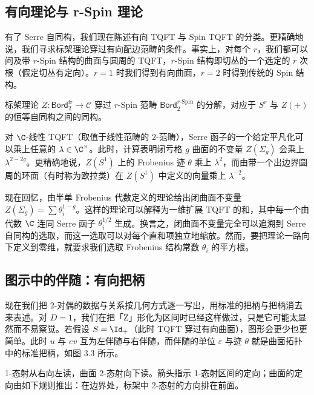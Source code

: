\subsection{有向理论与 r-Spin 理论}

有了 Serre 自同构，我们现在陈述有向 TQFT 与 Spin TQFT 的分类。更精确地说，我们寻求标架理论穿过有向配边范畴的条件。事实上，对每个 $r$，我们都可以问及带 $r$-Spin 结构的曲面与圆周的 TQFT，$r$-Spin 结构即切丛的一个选定的 $r$ 次根（假定切丛有定向）。$r=1$ 时我们得到有向曲面，$r=2$ 时得到传统的 Spin 结构。

\begin{theorem}\label{thm:3.4.14}
标架理论 $Z\colon\mathsf{Bord}^{\mathrm{fr}}_2\to\mathcal{C}$ 穿过 $r$-Spin 范畴 $\mathsf{Bord}^{r\text{-}\mathrm{Spin}}_2$ 的分解，对应于 $S^r$ 与 $Z(+)$ 的恒等自同构之间的同构。
\end{theorem}

\begin{example}[半单 TQFT]\label{ex:3.4.15}
对 $\C$-线性 TQFT（取值于线性范畴的 2-范畴），Serre 函子的一个给定平凡化可以乘上任意的 $\lambda\in\C^\times$。此时，计算表明闭亏格 $g$ 曲面的不变量 $Z(\Sigma_g)$ 会乘上 $\lambda^{2-2g}$。更精确地说，$Z(S^1)$ 上的 Frobenius 迹 $\theta$ 乘上 $\lambda^2$，而由带一个出边界圆周的环面（有时称为欧拉类）在 $Z(S^1)$ 中定义的向量乘上 $\lambda^{-2}$。

现在回忆，由半单 Frobenius 代数定义的理论给出闭曲面不变量 $Z(\Sigma_g)=\sum\theta_i^{1-g}$。这样的理论可以解释为一维扩展 TQFT 的和，其中每一个由代数 $\C$ 连同 Serre 函子 $\theta_i^{1/2}$ 生成。换言之，闭曲面不变量完全可以追溯到 Serre 自同构的选取，而这一选取可以对每个直和项独立地缩放。然而，要把理论一路向下定义到零维，就要求我们选取 Frobenius 结构常数 $\theta_i$ 的平方根。
\end{example}

\subsection{图示中的伴随：有向把柄}

现在我们把 2-对偶的数据与关系按几何方式逐一写出，用标准的把柄与把柄消去来表述。对 $D=1$，我们在把「Z」形化为区间时已经这样做过，只是它可能太显然而不易察觉。若假设 $S=\Id_+$（此时 TQFT 穿过有向曲面），图形会更少也更简单。此时 $u$ 与 $ev$ 互为左伴随与右伴随，而伴随的单位 $\varepsilon$ 与迹 $\theta$ 就是曲面拓扑中的标准把柄，如图 3.3 所示。

1-态射从右向左读，曲面 2-态射向下读。箭头指示 1-态射区间的定向；曲面的定向由如下规则推出：在边界处，标架中 2-态射的方向排在前面。

